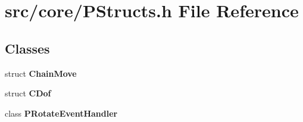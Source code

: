 \section{src/core/PStructs.h File Reference}
\label{PStructs_8h}


\subsection*{Classes}
\begin{CompactItemize}
\item 
struct {\bf Chain\-Move}
\item 
struct {\bf CDof}
\item 
class {\bf PRotate\-Event\-Handler}
\end{CompactItemize}
